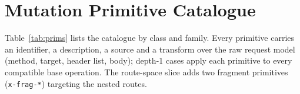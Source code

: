 \section{Mutation Primitive Catalogue}\label{app:primitives}
Table~\ref{tab:prims} lists the catalogue by class and family. Every primitive
carries an identifier, a description, a source and a transform over the raw
request model (method, target, header list, body); depth-1 cases apply each
primitive to every compatible base operation. The route-space slice adds two
fragment primitives (\texttt{x-frag-*}) targeting the nested routes.

